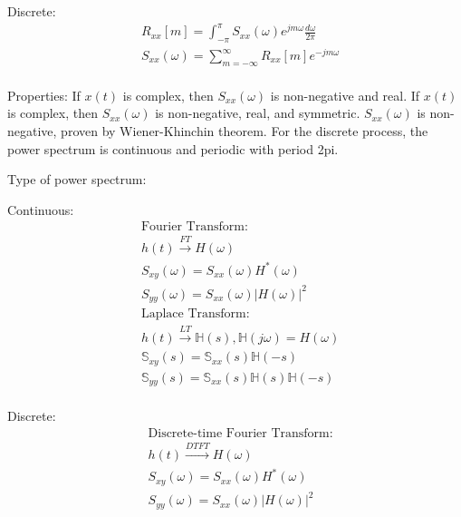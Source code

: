 \documentclass[12pt]{article}
\begin{document}
\begin{multicols*}{4}
Discrete:
\useshortskip \begin{equation*}
    \begin{split}
        & R_{xx}[m] = \int^{\pi}_{-\pi}S_{xx}(\omega)e^{jm\omega}\frac{d\omega}{2\pi}\\[-4pt]
        & S_{xx}(\omega) = \sum^{\infty}_{m=-\infty} R_{xx}[m] e^{-jm\omega}\\[-7pt]
    \end{split}
\end{equation*}

Properties: If $x(t)$ is complex, then $S_{xx}(\omega)$ is non-negative and real. If $x(t)$ is complex, then $S_{xx}(\omega)$ is non-negative, real, and symmetric. $S_{xx}(\omega)$ is non-negative, proven by Wiener-Khinchin theorem. For the discrete process, the power spectrum is continuous and periodic with period 2pi.

Type of power spectrum: 

Continuous: 
\useshortskip \begin{equation*}
    \begin{split}
        & \text{Fourier Transform:}\\[-5pt]
        & h(t)\xrightarrow{FT}H(\omega)\\[-3pt]
        & S_{xy}(\omega) = S_{xx}(\omega)H^*(\omega) \\[-3pt]
        & S_{yy}(\omega) = S_{xx}(\omega)|H(\omega)|^2 \\[-3pt]
        & \text{Laplace Transform:}\\[-5pt]
        & h(t) \xrightarrow{LT}\mathbb{H}(s), \mathbb{H}(j\omega) = H(\omega)\\[-3pt]
        & \mathbb{S}_{xy}(s) = \mathbb{S}_{xx}(s)\mathbb{H}(-s)\\[-3pt]
        & \mathbb{S}_{yy}(s) = \mathbb{S}_{xx}(s)\mathbb{H}(s)\mathbb{H}(-s)\\[-7pt]
    \end{split}
\end{equation*}

Discrete:
\useshortskip \begin{equation*}
    \begin{split}
    & \text{Discrete-time Fourier Transform:}\\[-5pt]
    & h(t)\xrightarrow{DTFT}H(\omega)\\[-3pt]
    & S_{xy}(\omega) = S_{xx}(\omega)H^*(\omega) \\[-3pt]
    & S_{yy}(\omega) = S_{xx}(\omega)|H(\omega)|^2 \\
    \end{split}
\end{equation*}


\end{multicols*}
\end{document}

